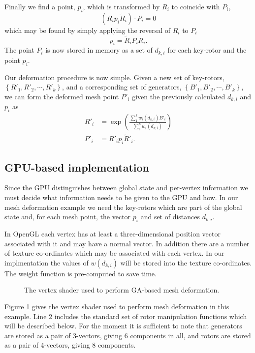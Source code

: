 Finally we find a point, $p_i$, which is transformed by $R_i$ to coincide
with $P_i$,
\[
(R_i p_i \tilde{R}_i) \cdot P_i = 0
\]
which may be found by simply applying the reversal of $R_i$ to $P_i$
\[
p_i = \tilde{R}_i P_i R_i.
\]
The point $P_i$ is now stored in memory as a set of $d_{k,i}$ for each
key-rotor and the point $p_i$.

Our deformation procedure is now simple. Given a new set of key-rotors,
$\left\{ R'_1, R'_2, \cdots, R'_k \right\}$, and a corresponding set of
generators, $\left\{B'_1, B'_2, \cdots, B'_k\right\}$, we can form the deformed
mesh point $P'_i$ given the previously calculated $d_{k,i}$ and $p_i$ as
\begin{align}
R'_i &= 
\exp\left(\frac{\sum^{k}_1 w_i(d_{k,i}) B'_i}{\sum^{k}_1 w_i(d_{k,i})}\right) \label{eqn:summation} \\
P'_i &= R'_i p_i \tilde{R}'_i.
\end{align}

\subsection{GPU-based implementation}

Since the GPU distinguishes between global state and per-vertex information we
must decide what information needs to be given to the GPU and how. In our mesh
deformation example we need the key-rotors which are part of the global state
and, for each mesh point, the vector $p_i$ and set of distances $d_{k,i}$.

In OpenGL each vertex has at least a three-dimensional position vector associated 
with it and may have a normal vector. In addition there are a number of 
texture co-ordinates which may be associated with each vertex. In our implmentation
the values of $w(d_{k,i})$ will be stored into the texture co-ordinates. The weight
function is pre-computed to save time.

\begin{figure}[p]
\centering
\scalebox{0.8}{
\begin{minipage}{\textwidth}
\singlespacing

\end{minipage}}
\caption{\label{fig:meshshader}The vertex shader used to perform GA-based mesh
deformation.}
\end{figure}

Figure \ref{fig:meshshader} gives the vertex shader used to perform mesh deformation in
this example. Line 2 includes the standard set of rotor manipulation functions which
will be described below. For the moment it is sufficient to note that generators are
stored as a pair of 3-vectors, giving 6 components in all, and rotors are stored as a
pair of 4-vectors, giving 8 components.

